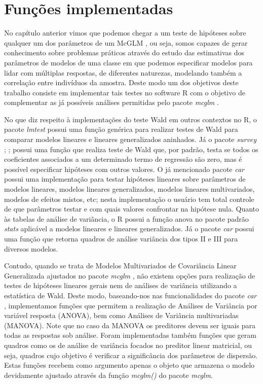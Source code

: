 
\chapter{Funções implementadas}

\label{cap:funcoes}


No capítulo anterior vimos que podemos chegar a um teste de hipóteses sobre qualquer um dos parâmetros de um McGLM \citep{Bonat16}, ou seja, somos capazes de gerar conhecimento sobre problemas práticos através do estudo das estimativas dos parâmetros de modelos de uma classe em que podemos especificar modelos para lidar com múltiplas respostas, de diferentes naturezas, modelando também a correlação entre indivíduos da amostra. Deste modo um dos objetivos deste trabalho consiste em implementar tais testes no software R \citep{softwareR} com o objetivo de complementar as já possíveis análises permitidas pelo pacote \emph{mcglm} \citep{mcglm}.

No que diz respeito à implementações do teste Wald em outros contextos no R, o pacote \emph{lmtest} \citep{lmtest} possui uma função genérica para realizar testes de Wald para comparar modelos lineares e lineares generalizados aninhados. Já o pacote \emph{survey} \citep{survey1}; \citep{survey2};\citep{survey3} possui uma função que realiza teste de Wald que, por padrão, testa se todos os coeficientes associados a um determinado termo de regressão são zero, mas é possível especificar hipóteses com outros valores. O já mencionado pacote \emph{car} \citep{car} possui uma implementação para testar hipóteses lineares sobre parâmetros de modelos lineares, modelos lineares generalizados, modelos lineares multivariados, modelos de efeitos mistos, etc; nesta implementação o usuário tem total controle de que parâmetros testar e com quais valores confrontar na hipótese nula. Quanto às tabelas de análise de variância, o R possui a função anova no pacote padrão \emph{stats} \citep{softwareR} aplicável a modelos lineares e lineares generalizados. Já o pacote \emph{car} \citep{car} possui uma função que retorna quadros de análise variância dos tipos II e III para diversos modelos. 

Contudo, quando se trata de Modelos Multivariados de Covariância Linear Generalizada ajustados no pacote \emph{mcglm} \citep{mcglm}, não existem opções para realização de testes de hipóteses lineares gerais nem de análises de variância utilizando a estatística de Wald. Deste modo, baseando-nos nas funcionalidades do pacote \emph{car} \citep{car}, implementamos funções que permitem a realização de Análises de Variância por variável resposta (ANOVA), bem como Análises de Variância multivariadas (MANOVA). Note que no caso da MANOVA os preditores devem ser iguais para todas as respostas sob análise. Foram implementadas também funções que geram quadros como os de análise de variância focados no preditor linear matricial, ou seja, quadros cujo objetivo é verificar a significância dos parâmetros de dispersão. Estas funções recebem como argumento apenas o objeto que armazena o modelo devidamente ajustado através da função \emph{mcglm()} do pacote \emph{mcglm}.

